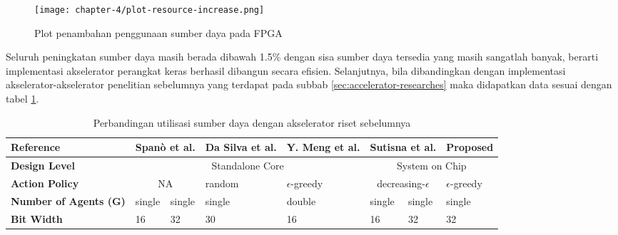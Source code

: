 \begin{figure}[h]
	\centering
	\texttt{[image: chapter-4/plot-resource-increase.png]}
	\caption{Plot penambahan penggunaan sumber daya pada \ac{FPGA}}
	\label{fig:plot-resource-increase}
\end{figure}

Seluruh peningkatan sumber daya masih berada dibawah 1.5\% dengan sisa sumber daya tersedia yang masih sangatlah banyak, berarti implementasi akselerator perangkat keras berhasil dibangun secara efisien. Selanjutnya, bila dibandingkan dengan implementasi akselerator-akselerator penelitian sebelumnya yang terdapat pada subbab \ref{sec:accelerator-researches} maka didapatkan data sesuai dengan tabel \ref{tab:comparison-utilization}.


\begin{table}[h]
	\centering
	\caption{Perbandingan utilisasi sumber daya dengan akselerator riset sebelumnya}
	\label{tab:comparison-utilization}
	\renewcommand{\arraystretch}{1.2}
	\setlength{\tabcolsep}{3pt}
	\begin{tabularx}{\textwidth}{|p{20mm}|X|X|X|X|X|X|X|}
		\hline
		\textbf{Reference}            & \multicolumn{2}{c|}{Spanò et al. \parencite{spano2019efficient}} & Da Silva et al. \parencite{dasilva2019parallel} & Y. Meng et al. \parencite{meng2020generic} & \multicolumn{2}{c|}{Sutisna et al. \parencite{sutisna2023faraneq}} & Proposed                            \\ \hline
		\textbf{Design Level}         & \multicolumn{4}{c|}{Standalone Core}                             & \multicolumn{3}{c|}{System on Chip}                                                                                                                                                                     \\ \hline
		\textbf{Action Policy}        & \multicolumn{2}{c|}{NA}                                          & random                                          & $\epsilon$-greedy                          & \multicolumn{2}{c|}{decreasing-$\epsilon$}                         & $\epsilon$-greedy                   \\ \hline
		\textbf{Number of Agents (G)} & single                                                           & single                                          & single                                     & double                                                             & single            & single & single \\ \hline
		\textbf{Bit Width}            & 16                                                               & 32                                              & 30                                         & 16                                                                 & 16                & 32     & 32     \\ \hline

\end{tabularx}
\end{table}
